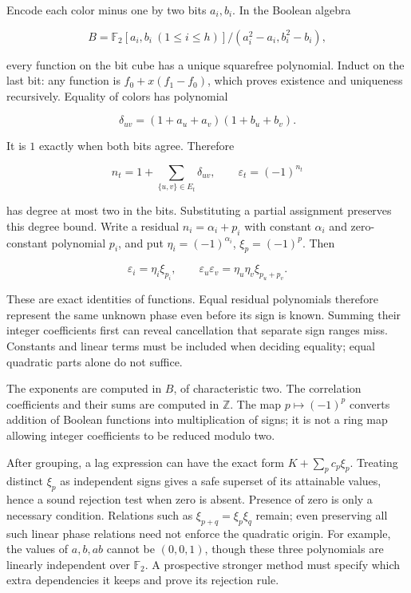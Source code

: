 \documentclass[
  11pt,
]{article}
\begin{document}
Encode each color minus one by two bits \(a_i,b_i\). In the Boolean
algebra

\[B=\mathbb F_2[a_i,b_i\ (1\le i\le h)]/
(a_i^2-a_i,b_i^2-b_i),\]

every function on the bit cube has a unique squarefree polynomial.
Induct on the last bit: any function is \(f_0+x(f_1-f_0)\), which proves
existence and uniqueness recursively. Equality of colors has polynomial

\[\delta_{uv}=(1+a_u+a_v)(1+b_u+b_v).\]

It is \(1\) exactly when both bits agree. Therefore

\[n_t=1+\sum_{\{u,v\}\in E_t}\delta_{uv},\qquad
\varepsilon_t=(-1)^{n_t}\]

has degree at most two in the bits. Substituting a partial assignment
preserves this degree bound. Write a residual \(n_i=\alpha_i+p_i\) with
constant \(\alpha_i\) and zero-constant polynomial \(p_i\), and put
\(\eta_i=(-1)^{\alpha_i}\), \(\xi_p=(-1)^p\). Then

\[\varepsilon_i=\eta_i\xi_{p_i},\qquad
\varepsilon_u\varepsilon_v=\eta_u\eta_v\xi_{p_u+p_v}.\]

These are exact identities of functions. Equal residual polynomials
therefore represent the same unknown phase even before its sign is
known. Summing their integer coefficients first can reveal cancellation
that separate sign ranges miss. Constants and linear terms must be
included when deciding equality; equal quadratic parts alone do not
suffice.

The exponents are computed in \(B\), of characteristic two. The
correlation coefficients and their sums are computed in \(\mathbb Z\).
The map \(p\mapsto(-1)^p\) converts addition of Boolean functions into
multiplication of signs; it is not a ring map allowing integer
coefficients to be reduced modulo two.

After grouping, a lag expression can have the exact form
\(K+\sum_pc_p\xi_p\). Treating distinct \(\xi_p\) as independent signs
gives a safe superset of its attainable values, hence a sound rejection
test when zero is absent. Presence of zero is only a necessary
condition. Relations such as \(\xi_{p+q}=\xi_p\xi_q\) remain; even
preserving all such linear phase relations need not enforce the
quadratic origin. For example, the values of \(a,b,ab\) cannot be
\((0,0,1)\), though these three polynomials are linearly independent
over \(\mathbb F_2\). A prospective stronger method must specify which
extra dependencies it keeps and prove its rejection rule.
\end{document}
